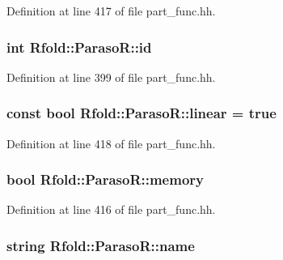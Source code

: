 Definition at line 417 of file part\+\_\+func.\+hh.

\hypertarget{class_rfold_1_1_paraso_r_a707ccdcc12115fbe06a923fb21e58c06}{
\subsubsection[{id}]{\setlength{\rightskip}{0pt plus 5cm}int Rfold\+::\+Paraso\+R\+::id}}\label{class_rfold_1_1_paraso_r_a707ccdcc12115fbe06a923fb21e58c06}


Definition at line 399 of file part\+\_\+func.\+hh.

\hypertarget{class_rfold_1_1_paraso_r_a45220d67941bf0c7f97c1eb586511cb8}{
\subsubsection[{linear}]{\setlength{\rightskip}{0pt plus 5cm}const bool Rfold\+::\+Paraso\+R\+::linear = true\hspace{0.3cm}{\ttfamily [static]}}}\label{class_rfold_1_1_paraso_r_a45220d67941bf0c7f97c1eb586511cb8}


Definition at line 418 of file part\+\_\+func.\+hh.

\hypertarget{class_rfold_1_1_paraso_r_aac983ca08d7d6efbca76b6575ee839e2}{
\subsubsection[{memory}]{\setlength{\rightskip}{0pt plus 5cm}bool Rfold\+::\+Paraso\+R\+::memory}}\label{class_rfold_1_1_paraso_r_aac983ca08d7d6efbca76b6575ee839e2}


Definition at line 416 of file part\+\_\+func.\+hh.

\hypertarget{class_rfold_1_1_paraso_r_a52b17c1475bc8319251b6fbde1a5a6d9}{
\subsubsection[{name}]{\setlength{\rightskip}{0pt plus 5cm}string Rfold\+::\+Paraso\+R\+::name}}\label{class_rfold_1_1_paraso_r_a52b17c1475bc8319251b6fbde1a5a6d9}


